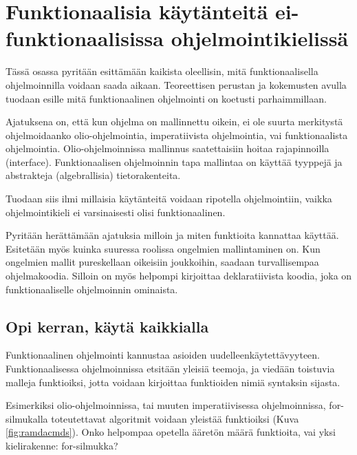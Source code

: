 \vspace{21.5pt}
\chapter{Funktionaalisia käytänteitä ei-funktionaalisissa ohjelmointikielissä}

Tässä osassa pyritään esittämään kaikista oleellisin, mitä funktionaalisella ohjelmoinnilla voidaan saada aikaan. Teoreettisen perustan ja kokemusten avulla tuodaan esille mitä funktionaalinen ohjelmointi on koetusti parhaimmillaan.

Ajatuksena on, että kun ohjelma on mallinnettu oikein, ei ole suurta merkitystä ohjelmoidaanko olio-ohjelmointia, imperatiivista ohjelmointia, vai funktionaalista ohjelmointia. Olio-ohjelmoinnissa mallinnus saatettaisiin hoitaa rajapinnoilla (interface). Funktionaalisen ohjelmoinnin tapa mallintaa on käyttää tyyppejä ja abstrakteja (algebrallisia) tietorakenteita.


Tuodaan siis ilmi millaisia käytänteitä voidaan ripotella ohjelmointiin, vaikka ohjelmointikieli ei varsinaisesti olisi funktionaalinen.

Pyritään herättämään ajatuksia milloin ja miten funktioita kannattaa käyttää. Esitetään myös kuinka suuressa roolissa ongelmien mallintaminen on. Kun ongelmien mallit pureskellaan oikeisiin joukkoihin, saadaan turvallisempaa ohjelmakoodia. Silloin on myös helpompi kirjoittaa deklaratiivista koodia, joka on funktionaaliselle ohjelmoinnin ominaista.



\section{Opi kerran, käytä kaikkialla}

Funktionaalinen ohjelmointi kannustaa asioiden uudelleenkäytettävyyteen. Funktionaalisessa ohjelmoinnissa etsitään yleisiä teemoja, ja viedään toistuvia malleja funktioiksi, jotta voidaan kirjoittaa funktioiden nimiä syntaksin sijasta.


Esimerkiksi olio-ohjelmoinnissa, tai muuten imperatiivisessa ohjelmoinnissa, for-silmukalla toteutettavat algoritmit voidaan yleistää funktioiksi (Kuva \ref{fig:ramdacmds}). Onko helpompaa opetella ääretön määrä funktioita, vai yksi kielirakenne: for-silmukka?

